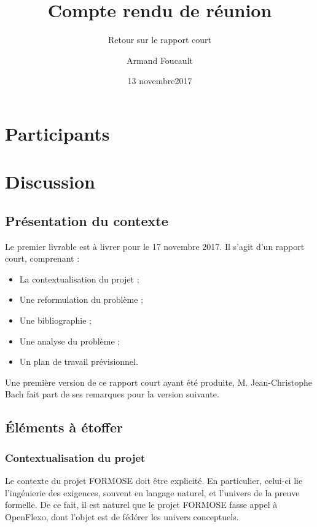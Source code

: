 \documentclass{article}
\author{Armand Foucault}
\date{13 novembre2017}
\title{Compte rendu de réunion}
\subtitle{Retour sur le rapport court}
\begin{document}
\imtammMaketitle

\section*{Participants}

\begin{imtammActorList}
\item \actorjcbach
\item \actorafoucaul
\end{imtammActorList}


\section*{Discussion}

\subsection*{Présentation du contexte}

Le premier livrable est à livrer pour le 17 novembre 2017.
Il s'agit d'un rapport court, comprenant :

\begin{itemize}
    \item La contextualisation du projet ;
    \item Une reformulation du problème ;
    \item Une bibliographie ;
    \item Une analyse du problème ;
    \item Un plan de travail prévisionnel.
\end{itemize}

Une première version de ce rapport court ayant été produite, M. Jean-Christophe Bach fait part de ses remarques pour la version suivante.

\subsection*{Éléments à étoffer}

\subsubsection*{Contextualisation du projet}

Le contexte du projet FORMOSE doit être explicité.
En particulier, celui-ci lie l'ingénierie des exigences, souvent en langage naturel, et l'univers de la preuve formelle.
De ce fait, il est naturel que le projet FORMOSE fasse appel à OpenFlexo, dont l'objet est de fédérer les univers conceptuels.
\end{document}
